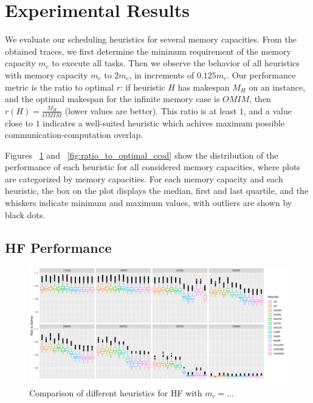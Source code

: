 \documentclass[sigconf]{acmart}
\begin{document}
{		
		\section{Experimental Results}
		\label{sec:expResults}
		We evaluate our scheduling heuristics for several memory capacities. From the obtained traces, we first determine the minimum requirement of the memory capacity $m_c$ to execute all tasks. Then we observe the behavior of all heuristics with memory capacity $m_c$ to $2m_c$, in increments of $0.125m_c$. Our performance metric is the ratio to optimal $r$: if heuristic $H$ has makespan $M_H$ on an instance, and the optimal makespan for the infinite memory case is $OMIM$, then $r(H)=\frac{M_H}{OMIM}$ (lower values are better). This ratio is at least $1$, and a value close to $1$ indicates a well-suited  heuristic which achives maximum possible communication-computation overlap.
		
		Figures ~\ref{fig:ratio_to_optimal_hf} and ~\ref{fig:ratio_to_optimal_ccsd} show the distribution of the performance of each heuristic for all considered memory capacities, where plots are categorized by memory capacities. For each memory capacity and each heuristic, the box on the plot displays the median, first and last quartile, and the whiskers indicate minimum and maximum values, with outliers are shown by black dots.
		\subsection{HF Performance}	
		\begin{figure}[htb]
			\includegraphics[scale=0.5]{./all-binpack/ratio_to_optimal_selected_hf.pdf}
			\caption{Comparison of different heuristics for HF with $m_c=..$.}
			\label{fig:ratio_to_optimal_hf}
		\end{figure}
		
}
\end{document}
